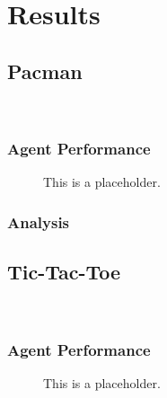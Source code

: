 \chapter{Results}
\label{cha:result}




\section{Pacman}\
\label{sec:pacman}
\subsection{Agent Performance} 


\begin{figure}[!hbtp]
  \label{fig:cost}
  \makebox[\textwidth]{\framebox[5cm]{\rule{0pt}{5cm}}}
\caption{This is a placeholder.{\label{pacman_performance}}}
  



\end{figure}


\subsection{Analysis}


\section{Tic-Tac-Toe}\
\label{sec:tic_tac_toe}
\subsection{Agent Performance} 


\begin{figure}[!hbtp]
  \label{fig:cost}
  \makebox[\textwidth]{\framebox[5cm]{\rule{0pt}{5cm}}}
\caption{This is a placeholder.{\label{tic_tac_toe_performance}}}
  



\end{figure}



